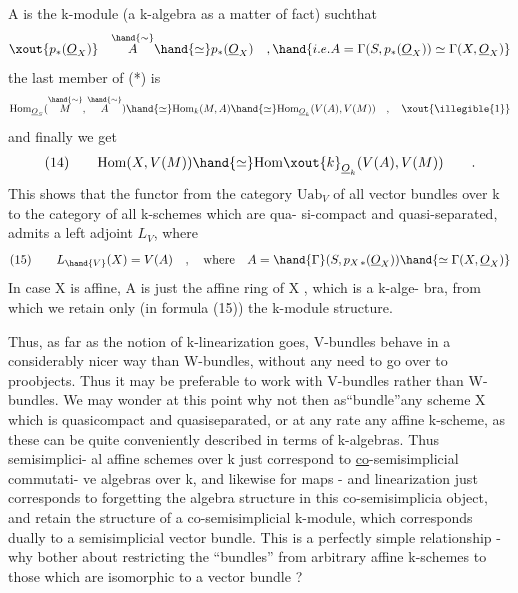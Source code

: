 
A is the  k-module (a k-algebra as a matter of fact) suchthat
\[ \xout{p_*(\underline{O}_X)} \quad \overset{\hand{\sim}}{A} \hand{\simeq} p_*(\underline{O}_X) \quad , \hand{i.e. A=\Gamma(S,p_*(\underline{O}_X))\simeq\Gamma(X,\underline{O}_X)} \]
the last member of (*) is
\[ \mathrm{Hom}_{\underline{O}_S}(\overset{\hand{\sim}}{M} , \overset{\hand{\sim}}{A}) \hand{\simeq} \mathrm{Hom}_k(M,A) \hand{\simeq} \mathrm{Hom}_{\underline{O}_k}(V(A), V(M)) \quad , \quad \xout{\illegible{1}} \]
and finally we get
\[ (14) \qquad \mathrm{Hom}(X,V(M)) \hand{\simeq} \mathrm{Hom}\xout{k}_{\underline{O}_k}(V(A),V(M)) \qquad . \]
This shows that the  functor from the category $\mathrm{Uab}_V$ of all
vector bundles over k to the category of all  k-schemes which are qua-%
si-compact and quasi-separated, admits a left adjoint $L_V$, where
\[ (15) \qquad L_{\hand{V}}(X) = V(A) \quad , \quad \text{where} \quad A = \hand{\Gamma}(S, p_{X\,*}(\underline{O}_X)) \hand{\simeq \Gamma(X,\underline{O}_X)} \]
In case X is affine, A is just the affine ring of X , which is a k-alge-%
bra, from which we retain only (in formula (15)) the k-module structure.

Thus, as far as the notion of k-linearization goes, V-bundles
behave in a considerably nicer way than W-bundles, without any need to
go over to proobjects.  Thus it may be preferable to
work with V-bundles rather than W-bundles. We may wonder at this point
why not  then as``bundle''any scheme X which is quasicompact and
quasiseparated, or at any rate any affine k-scheme, as these can be
quite conveniently described in terms of k-algebras. Thus\hand{,} semisimplici-%
al affine schemes over k just correspond to \uline{co}-semisimplicial commutati-%
ve algebras over k, and likewise for maps - and linearization just
corresponds to forgetting the algebra structure in this co-semisimplicia
object, and retain the structure of a co-semisimplicial k-module,
which corresponds dually to a semisimplicial vector bundle. This is
a perfectly simple relationship - why bother about restricting the
``bundles'' from arbitrary affine k-schemes to those which are isomorphic
to a vector bundle ?

